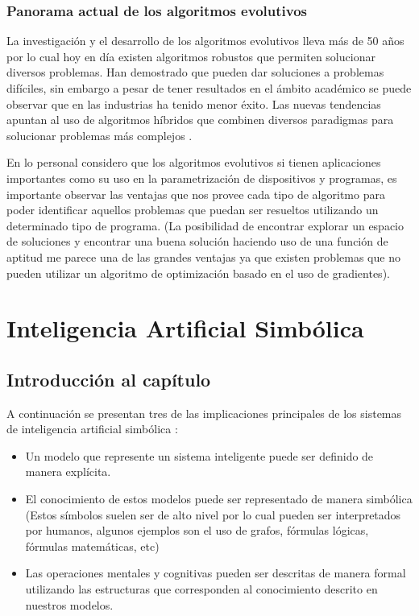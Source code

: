 \documentclass[11pt,fleqn]{book} %
\begin{document}
\subsection{Panorama actual de los algoritmos evolutivos} 

La investigación y el desarrollo de los algoritmos evolutivos lleva más de 50 años por lo cual hoy en día existen algoritmos robustos que permiten solucionar diversos problemas. Han demostrado que pueden dar soluciones a problemas difíciles, sin embargo a pesar de tener resultados en el ámbito académico se puede observar que en las industrias ha tenido menor éxito. Las nuevas tendencias apuntan al uso de algoritmos híbridos que combinen diversos paradigmas para solucionar problemas más complejos \cite{slossEA}.

En lo personal considero que los algoritmos evolutivos si tienen aplicaciones importantes como su uso en la parametrización de dispositivos y programas, es importante observar las ventajas que nos provee cada tipo de algoritmo para poder identificar aquellos problemas que puedan ser resueltos utilizando un determinado tipo de programa. (La posibilidad de encontrar explorar un espacio de soluciones y encontrar una buena solución haciendo uso de una función de aptitud me parece una de las grandes ventajas ya que existen problemas que no pueden utilizar un algoritmo de optimización basado en el uso de gradientes).

\chapter{Inteligencia Artificial Simbólica} 

\section{Introducción al capítulo} 

A continuación se presentan tres de las implicaciones principales de los sistemas de inteligencia artificial simbólica \cite{flasinski2016symbolic}:
\begin{itemize}
\item Un modelo que represente un sistema inteligente puede ser definido de manera explícita.
\item El conocimiento de estos modelos puede ser representado de manera simbólica (Estos símbolos suelen ser de alto nivel por lo cual pueden ser interpretados por humanos, algunos ejemplos son el uso de grafos, fórmulas lógicas, fórmulas matemáticas, etc)
\item Las operaciones mentales y cognitivas pueden ser descritas de manera formal utilizando las estructuras que corresponden al conocimiento descrito en nuestros modelos.
\end{itemize}
\end{document}
